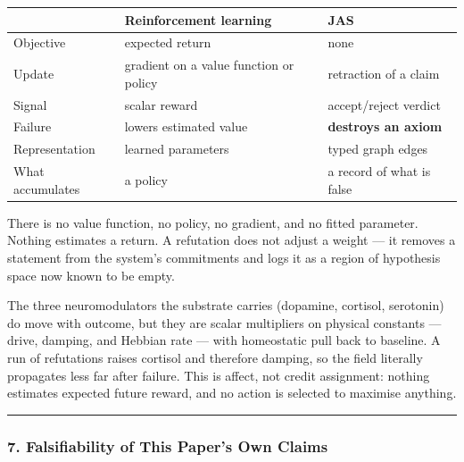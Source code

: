 \documentclass[
  11pt,
  a4paper,
]{article}
\begin{document}
\begin{longtable}[]{@{}
  >{\raggedright\arraybackslash}p{}
  >{\raggedright\arraybackslash}p{}
  >{\raggedright\arraybackslash}p{}@{}}
\toprule\noalign{}
\begin{minipage}[b]{\linewidth}\raggedright
\end{minipage} & \begin{minipage}[b]{\linewidth}\raggedright
Reinforcement learning
\end{minipage} & \begin{minipage}[b]{\linewidth}\raggedright
JAS
\end{minipage} \\
\midrule\noalign{}
\endhead
\bottomrule\noalign{}
\endlastfoot
Objective & expected return & none \\
Update & gradient on a value function or policy & retraction of a
claim \\
Signal & scalar reward & accept/reject verdict \\
Failure & lowers estimated value & \textbf{destroys an axiom} \\
Representation & learned parameters & typed graph edges \\
What accumulates & a policy & a record of what is false \\
\end{longtable}

There is no value function, no policy, no gradient, and no fitted
parameter. Nothing estimates a return. A refutation does not adjust a
weight --- it removes a statement from the system's commitments and logs
it as a region of hypothesis space now known to be empty.

The three neuromodulators the substrate carries (dopamine, cortisol,
serotonin) do move with outcome, but they are scalar multipliers on
physical constants --- drive, damping, and Hebbian rate --- with
homeostatic pull back to baseline. A run of refutations raises cortisol
and therefore damping, so the field literally propagates less far after
failure. This is affect, not credit assignment: nothing estimates
expected future reward, and no action is selected to maximise anything.

\begin{center}\rule{0.5\linewidth}{0.5pt}\end{center}

\subsubsection{7. Falsifiability of This Paper's Own
Claims}\label{falsifiability-of-this-papers-own-claims}
\end{document}
